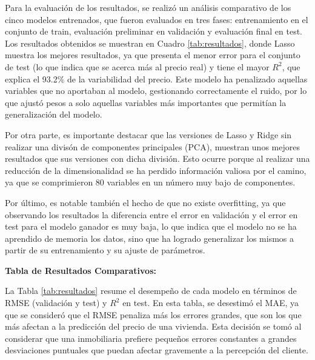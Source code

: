 \documentclass[a4paper,twocolumn]{article}
\begin{document}
	Para la evaluación de los resultados, se realizó un análisis comparativo de los cinco modelos entrenados, que fueron evaluados en tres fases: entrenamiento en el conjunto de train,
	evaluación preliminar en validación y evaluación final en test.
	Los resultados obtenidos se muestran en Cuadro \ref{tab:resultados}, donde Lasso muestra los mejores resultados, ya que presenta el menor error para el conjunto de test (lo que indica que se acerca más al precio real) y
	tiene el mayor $R^2$, que explica el 93.2\% de la variabilidad del precio. Este modelo ha penalizado aquellas variables que no aportaban al modelo, gestionando correctamente el ruido, por lo que ajustó
	pesos a solo aquellas variables más importantes que permitían la generalización del modelo.

	\vspace{0.2cm}

	Por otra parte, es importante destacar que las versiones de Lasso y Ridge sin realizar una divisón de componentes principales (PCA), muestran unos mejores resultados que sus versiones con dicha
	división. Esto ocurre porque al realizar una reducción de la dimensionalidad se ha perdido información valiosa por el camino, ya que se comprimieron 80 variables en un número muy bajo de componentes.

	\vspace{0.2cm}

	Por último, es notable también el hecho de que no existe overfitting, ya que observando los resultados la diferencia entre el error en validación y el error en test para el modelo ganador es muy baja,
	lo que indica que el modelo no se ha aprendido de memoria los datos, sino que ha logrado generalizar los mismos a partir de su entrenamiento y su ajuste de parámetros.

	\vspace{0.2cm}

	\textbf{Tabla de Resultados Comparativos:}

	\vspace{0.2cm}

	La Tabla \ref{tab:resultados} resume el desempeño de cada modelo en términos de RMSE (validación y test) y $R^2$ en test. En esta tabla, se desestimó el MAE, ya que se consideró que
	el RMSE penaliza más los errores grandes, que son los que más afectan a la predicción del precio de una vivienda. Esta decisión se tomó al considerar que una inmobiliaria prefiere pequeños
	errores constantes a grandes desviaciones puntuales que puedan afectar gravemente a la percepción del cliente.
\end{document}

